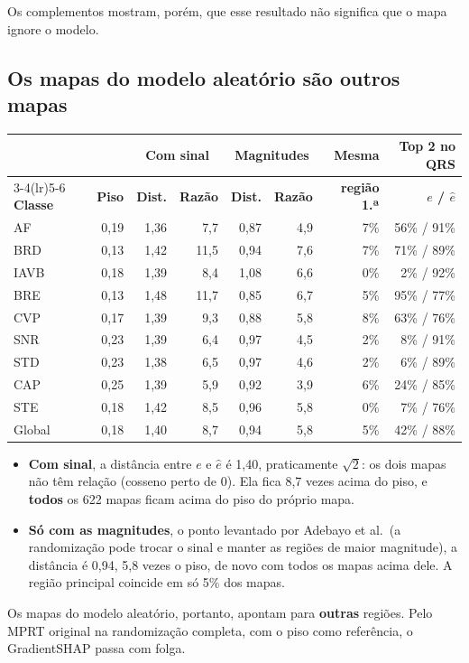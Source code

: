 \documentclass[11pt,a4paper]{article}
\begin{document}
Os complementos mostram, porém, que esse resultado não significa que o mapa ignore o modelo.

\subsection{Os mapas do modelo aleatório são outros mapas}
\begin{center}\small
\setlength{\tabcolsep}{4pt}
\begin{tabular}{lrrrrrrr}
\toprule
& & \multicolumn{2}{c}{\textbf{Com sinal}} & \multicolumn{2}{c}{\textbf{Magnitudes}} & \textbf{Mesma} & \textbf{Top 2 no QRS} \\
\cmidrule(lr){3-4}\cmidrule(lr){5-6}
\textbf{Classe} & \textbf{Piso} & \textbf{Dist.} & \textbf{Razão} & \textbf{Dist.} & \textbf{Razão} & \textbf{região 1.ª} & \textbf{$e$ / $\hat{e}$} \\
\midrule
AF   & 0,19 & 1,36 &  7,7 & 0,87 & 4,9 & 7\% & 56\% / 91\% \\
BRD  & 0,13 & 1,42 & 11,5 & 0,94 & 7,6 & 7\% & 71\% / 89\% \\
IAVB & 0,18 & 1,39 &  8,4 & 1,08 & 6,6 & 0\% &  2\% / 92\% \\
BRE  & 0,13 & 1,48 & 11,7 & 0,85 & 6,7 & 5\% & 95\% / 77\% \\
CVP  & 0,17 & 1,39 &  9,3 & 0,88 & 5,8 & 8\% & 63\% / 76\% \\
SNR  & 0,23 & 1,39 &  6,4 & 0,97 & 4,5 & 2\% &  8\% / 91\% \\
STD  & 0,23 & 1,38 &  6,5 & 0,97 & 4,6 & 2\% &  6\% / 89\% \\
CAP  & 0,25 & 1,39 &  5,9 & 0,92 & 3,9 & 6\% & 24\% / 85\% \\
STE  & 0,18 & 1,42 &  8,5 & 0,96 & 5,8 & 0\% &  7\% / 76\% \\
\midrule
Global & 0,18 & 1,40 & 8,7 & 0,94 & 5,8 & 5\% & 42\% / 88\% \\
\bottomrule
\end{tabular}
\end{center}
\begin{itemize}
\item \textbf{Com sinal}, a distância entre $e$ e $\hat{e}$ é 1,40, praticamente $\sqrt{2}$: os dois mapas não têm relação (cosseno perto de 0). Ela fica 8,7 vezes acima do piso, e \textbf{todos} os 622 mapas ficam acima do piso do próprio mapa.
\item \textbf{Só com as magnitudes}, o ponto levantado por Adebayo et al.\ (a randomização pode trocar o sinal e manter as regiões de maior magnitude), a distância é 0,94, 5,8 vezes o piso, de novo com todos os mapas acima dele. A região principal coincide em só 5\% dos mapas.
\end{itemize}
Os mapas do modelo aleatório, portanto, apontam para \textbf{outras} regiões. Pelo MPRT original na randomização completa, com o piso como referência, o GradientSHAP passa com folga.
\end{document}
